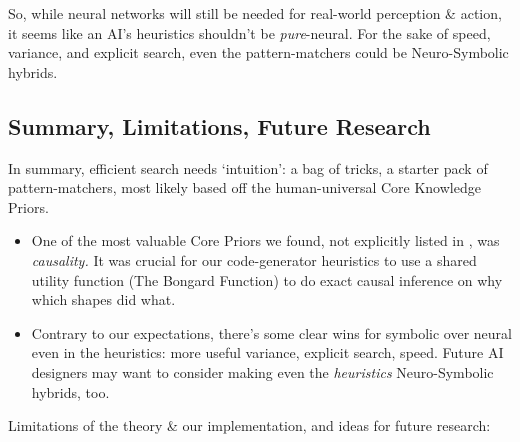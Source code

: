 \documentclass[11pt]{article}
\begin{document}
So, while neural networks will still be needed for real-world perception \& action, it seems like an AI's heuristics shouldn't be \textit{pure}-neural. For the sake of speed, variance, and explicit search, even the pattern-matchers could be Neuro-Symbolic hybrids.

\subsection{Summary, Limitations, Future Research}\label{sec:pattern_matching_limitations}

In summary, efficient search needs `intuition': a bag of tricks, a starter pack of pattern-matchers, most likely based off the human-universal Core Knowledge Priors.

\begin{itemize}
    \item One of the most valuable Core Priors we found, not explicitly listed in \citet{core_knowledge_priors}, was \textit{causality.} It was crucial for our code-generator heuristics to use a shared utility function (The Bongard Function) to do exact causal inference on why which shapes did what.
    \item Contrary to our expectations, there's some clear wins for symbolic over neural even in the heuristics: more useful variance, explicit search, speed. Future AI designers may want to consider making even the \textit{heuristics} Neuro-Symbolic hybrids, too.
\end{itemize}

Limitations of the theory \& our implementation, and ideas for future research:
\end{document}
